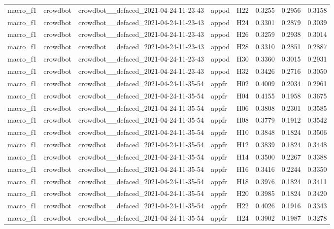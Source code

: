 \begin{table}[tbp]
\begin{tabular}{lllllrrr}
macro\_f1 & crowdbot & crowdbot\_\_defaced\_2021-04-24-11-23-43 & appod & H22 & 0.3255 & 0.2956 & 0.3158 \\
macro\_f1 & crowdbot & crowdbot\_\_defaced\_2021-04-24-11-23-43 & appod & H24 & 0.3301 & 0.2879 & 0.3039 \\
macro\_f1 & crowdbot & crowdbot\_\_defaced\_2021-04-24-11-23-43 & appod & H26 & 0.3259 & 0.2938 & 0.3014 \\
macro\_f1 & crowdbot & crowdbot\_\_defaced\_2021-04-24-11-23-43 & appod & H28 & 0.3310 & 0.2851 & 0.2887 \\
macro\_f1 & crowdbot & crowdbot\_\_defaced\_2021-04-24-11-23-43 & appod & H30 & 0.3360 & 0.3015 & 0.2931 \\
macro\_f1 & crowdbot & crowdbot\_\_defaced\_2021-04-24-11-23-43 & appod & H32 & 0.3426 & 0.2716 & 0.3050 \\
macro\_f1 & crowdbot & crowdbot\_\_defaced\_2021-04-24-11-35-54 & appfr & H02 & 0.4009 & 0.2034 & 0.2961 \\
macro\_f1 & crowdbot & crowdbot\_\_defaced\_2021-04-24-11-35-54 & appfr & H04 & 0.4155 & 0.1958 & 0.3675 \\
macro\_f1 & crowdbot & crowdbot\_\_defaced\_2021-04-24-11-35-54 & appfr & H06 & 0.3808 & 0.2301 & 0.3585 \\
macro\_f1 & crowdbot & crowdbot\_\_defaced\_2021-04-24-11-35-54 & appfr & H08 & 0.3779 & 0.1912 & 0.3542 \\
macro\_f1 & crowdbot & crowdbot\_\_defaced\_2021-04-24-11-35-54 & appfr & H10 & 0.3848 & 0.1824 & 0.3506 \\
macro\_f1 & crowdbot & crowdbot\_\_defaced\_2021-04-24-11-35-54 & appfr & H12 & 0.3839 & 0.1824 & 0.3448 \\
macro\_f1 & crowdbot & crowdbot\_\_defaced\_2021-04-24-11-35-54 & appfr & H14 & 0.3500 & 0.2267 & 0.3388 \\
macro\_f1 & crowdbot & crowdbot\_\_defaced\_2021-04-24-11-35-54 & appfr & H16 & 0.3416 & 0.2244 & 0.3350 \\
macro\_f1 & crowdbot & crowdbot\_\_defaced\_2021-04-24-11-35-54 & appfr & H18 & 0.3976 & 0.1824 & 0.3411 \\
macro\_f1 & crowdbot & crowdbot\_\_defaced\_2021-04-24-11-35-54 & appfr & H20 & 0.3985 & 0.1824 & 0.3420 \\
macro\_f1 & crowdbot & crowdbot\_\_defaced\_2021-04-24-11-35-54 & appfr & H22 & 0.4026 & 0.1916 & 0.3343 \\
macro\_f1 & crowdbot & crowdbot\_\_defaced\_2021-04-24-11-35-54 & appfr & H24 & 0.3902 & 0.1987 & 0.3278 \\

\end{tabular}
\end{table}
